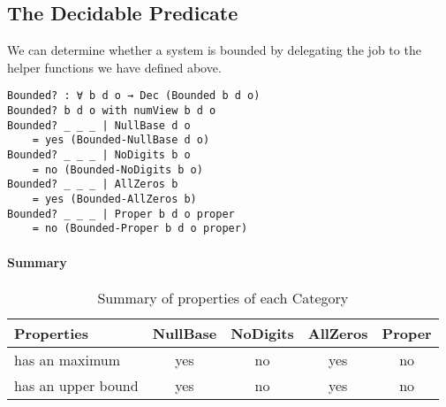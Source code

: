 \documentclass[\main/thesis.tex]{subfiles}
\begin{document}
\subsection{The Decidable Predicate}

We can determine whether a system is bounded by delegating the job to the
helper functions we have defined above.

\begin{lstlisting}
Bounded? : ∀ b d o → Dec (Bounded b d o)
Bounded? b d o with numView b d o
Bounded? _ _ _ | NullBase d o
    = yes (Bounded-NullBase d o)
Bounded? _ _ _ | NoDigits b o
    = no (Bounded-NoDigits b o)
Bounded? _ _ _ | AllZeros b
    = yes (Bounded-AllZeros b)
Bounded? _ _ _ | Proper b d o proper
    = no (Bounded-Proper b d o proper)
\end{lstlisting}

\paragraph{Summary}

\begin{table}[H]
    \centering
    \begin{adjustbox}{max width=\textwidth}
    \begin{tabular}{ | l | c | c | c | c | }
    \textbf{Properties} & \textbf{NullBase} & \textbf{NoDigits} & \textbf{AllZeros} & \textbf{Proper} \\
    \hline
    has an maximum     & yes & no & yes & no \\
    has an upper bound & yes & no & yes & no \\
    \end{tabular}
    \end{adjustbox}
\caption{Summary of properties of each Category}
\label{table:11}
\end{table}
\end{document}
